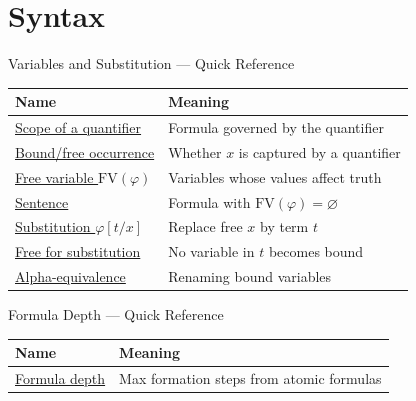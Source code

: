 \section{Syntax}




\begin{toolkitbox}{Variables and Substitution --- Quick Reference}
\small
\begin{tabular}{l l}
\toprule
\textbf{Name}  & \textbf{Meaning} \\
\midrule
\hyperref[def:scope]{Scope of a quantifier}   & Formula governed by the quantifier  \\
\hyperref[def:bound-free]{Bound/free occurrence}   & Whether $x$ is captured by a quantifier \\
\hyperref[def:fv]{Free variable $\mathrm{FV}(\varphi)$}  & Variables whose values affect truth \\
\hyperref[def:sentence]{Sentence}                & Formula with $\mathrm{FV}(\varphi)=\varnothing$ \\
\hyperref[def:subst-notation]{Substitution $\varphi[t/x]$}  & Replace free $x$ by term $t$      \\
\hyperref[def:free-for]{Free for substitution}   & No variable in $t$ becomes bound    \\
\hyperref[def:alpha-equiv]{Alpha-equivalence}       & Renaming bound variables             \\
\bottomrule
\end{tabular}
\end{toolkitbox}



\begin{toolkitbox}{Formula Depth --- Quick Reference}
\small
\begin{tabular}{l l}
\toprule
\textbf{Name}  & \textbf{Meaning} \\
\midrule
\hyperref[def:formula-depth]{Formula depth}  & Max formation steps from atomic formulas \\
\bottomrule
\end{tabular}
\end{toolkitbox}


